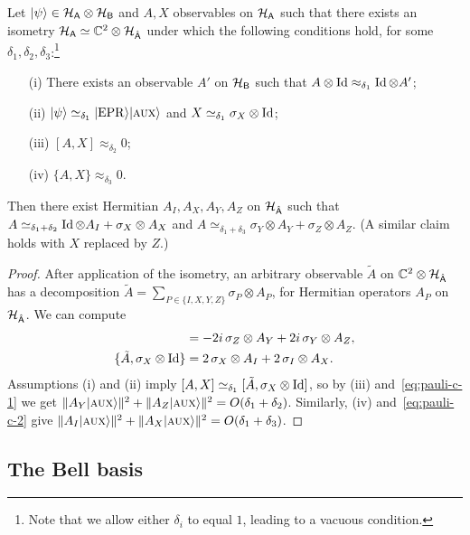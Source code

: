 \begin{lemma}\label{lem:pauli-c}
Let $|\psi\rangle \in \mathcal{H}_{{\textsf{A}}} \otimes \mathcal{H}_{{\textsf{B}}}$ and $A,X$ observables on $\mathcal{H}_{{\textsf{A}}}$ such that there exists an isometry $\mathcal{H}_{{\textsf{A}}} \simeq \mathbb{C}^2 \otimes \mathcal{H}_{\hat{{\textsf{A}}}}$ under which the following conditions hold, for some $\delta_1,\delta_2,\delta_3$:\footnote{Note that we allow either $\delta_i$ to equal $1$, leading to a vacuous condition.}
\begin{enumerate}
\item[(i)] There exists an observable $A'$ on $\mathcal{H}_{\textsf{B}}$ such that $A\otimes \mathop{\rm Id}\nolimits \approx_{\delta_1} \mathop{\rm Id}\nolimits \otimes A'$;
\item[(ii)] $|\psi\rangle \simeq_{\delta_1} |{\rm EPR}\rangle|\textsc {aux}\rangle$ and $X\simeq_{\delta_1} \sigma_X \otimes \mathop{\rm Id}\nolimits$; 
\item[(iii)] $[A,X]\approx_{\delta_2} 0$;
\item[(iv)] $\{A,X\} \approx_{\delta_3} 0$.
\end{enumerate}

Then there exist Hermitian $A_I,A_X,A_Y,A_Z$ on $\mathcal{H}_{\hat{{\textsf{A}}}}$ such that $A \simeq_{\delta_1+\delta_2} \mathop{\rm Id}\nolimits \otimes A_I + \sigma_X \otimes A_X$ and $A \simeq_{\delta_1 + \delta_3} \sigma_Y \otimes A_Y + \sigma_Z \otimes A_Z$. (A similar claim holds with $X$ replaced by $Z$.)
\end{lemma}

\begin{proof}
After application of the isometry, an arbitrary observable $\tilde{A}$ on  $\mathbb{C}^2 \otimes \mathcal{H}_{\hat{{\textsf{A}}}}$ has a decomposition $\tilde{A} = \sum_{P\in\{I,X,Y,Z\}} \sigma_P \otimes A_P$, for Hermitian operators $A_P$ on $\mathcal{H}_{\hat{{\textsf{A}}}}$. We can compute
\begin{align}
[\tilde{A},\sigma_X\otimes \Id] &= -2i\,\sigma_Z \otimes A_Y + 2i\,\sigma_Y \otimes A_Z,\label{eq:pauli-c-1}\\
\{\tilde{A},\sigma_X\otimes \Id\} &= 2\,\sigma_X \otimes A_I + 2 \,\sigma_I \otimes A_X.\label{eq:pauli-c-2}
\end{align} 
Assumptions (i) and (ii) imply $[A,X] \simeq_{\delta_1} [\tilde{A},\sigma_X \otimes \mathop{\rm Id}\nolimits]$, so by (iii) and~\eqref{eq:pauli-c-1} we get $\| A_Y |\textsc {aux}\rangle\|^2 + \|A_Z |\textsc {aux}\rangle\|^2 = O(\delta_1+\delta_2)$. Similarly, (iv) and~\eqref{eq:pauli-c-2} give $\| A_I |\textsc {aux}\rangle\|^2 + \|A_X |\textsc {aux}\rangle\|^2 = O(\delta_1+\delta_3)$.
\end{proof}


\subsection{The Bell basis}
\label{sec:bell}

